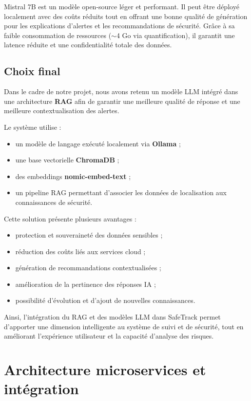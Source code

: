 Mistral 7B est un modèle open-source léger et performant. Il peut être déployé localement avec des coûts réduits tout en offrant une bonne qualité de génération pour les explications d’alertes et les recommandations de sécurité. Grâce à sa faible consommation de ressources ($\sim$4 Go via quantification), il garantit une latence réduite et une confidentialité totale des données.

\subsection{Choix final}

Dans le cadre de notre projet, nous avons retenu un modèle LLM intégré dans une architecture \textbf{RAG} afin de garantir une meilleure qualité de réponse et une meilleure contextualisation des alertes.

Le système utilise :
\begin{itemize}
    \item un modèle de langage exécuté localement via \textbf{Ollama} ;
    \item une base vectorielle \textbf{ChromaDB} ;
    \item des embeddings \textbf{nomic-embed-text} ;
    \item un pipeline RAG permettant d’associer les données de localisation aux connaissances de sécurité.
\end{itemize}

Cette solution présente plusieurs avantages :
\begin{itemize}
    \item protection et souveraineté des données sensibles ;
    \item réduction des coûts liés aux services cloud ;
    \item génération de recommandations contextualisées ;
    \item amélioration de la pertinence des réponses IA ;
    \item possibilité d’évolution et d’ajout de nouvelles connaissances.
\end{itemize}

Ainsi, l’intégration du RAG et des modèles LLM dans SafeTrack permet d’apporter une dimension intelligente au système de suivi et de sécurité, tout en améliorant l’expérience utilisateur et la capacité d’analyse des risques.

\section{Architecture microservices et intégration}

